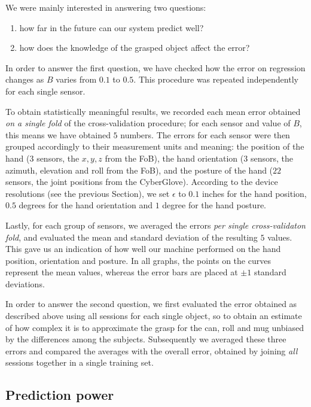 We were mainly interested in answering two questions:

\begin{enumerate}

  \item how far in the future can our system predict well?

  \item how does the knowledge of the grasped object affect the error?

\end{enumerate}

In order to answer the first question, we have checked how the error
on regression changes as $B$ varies from $0.1$ to $0.5$. This
procedure was repeated independently for each single sensor.

To obtain statistically meaningful results, we recorded each mean
error obtained \emph{on a single fold} of the cross-validation
procedure; for each sensor and value of $B$, this means we have
obtained $5$ numbers. The errors for each sensor were then grouped
accordingly to their measurement units and meaning: the position of
the hand ($3$ sensors, the $x,y,z$ from the FoB), the hand orientation
($3$ sensors, the azimuth, elevation and roll from the FoB), and the
posture of the hand ($22$ sensors, the joint positions from the
CyberGlove). According to the device resolutions (see the previous
Section), we set $\epsilon$ to $0.1$ inches for the hand position,
$0.5$ degrees for the hand orientation and $1$ degree for the hand
posture.

Lastly, for each group of sensors, we averaged the errors \emph{per
single cross-validaton fold}, and evaluated the mean and standard
deviation of the resulting $5$ values. This gave us an indication of
how well our machine performed on the hand position, orientation and
posture. In all graphs, the points on the curves represent the mean
values, whereas the error bars are placed at $\pm 1$ standard
deviations.

In order to answer the second question, we first evaluated the error
obtained as described above using all sessions for each single object,
so to obtain an estimate of how complex it is to approximate the grasp
for the can, roll and mug unbiased by the differences among the
subjects. Subsequently we averaged these three errors and compared the
averages with the overall error, obtained by joining \emph{all}
sessions together in a single training set.

\subsection{Prediction power}

